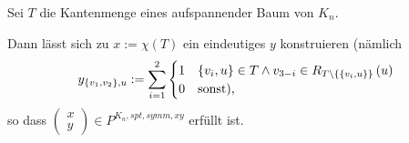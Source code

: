 \documentclass[10p,a4paper,BCOR = 12mm, DIV=15]{scrbook}
\begin{document}
\begin{Sa}
Sei $T$ die Kantenmenge eines aufspannender Baum von $K_n$.

Dann lässt sich zu $x:=\chi\left(T\right)$ ein eindeutiges $y$ konstruieren (nämlich 
\begin{equation}
y_{\left\{v_1, v_2\right\}, u} := \sum_{i=1}^2 \begin{cases}
1 & \left\{v_i, u\right\}\in T\wedge v_{3-i}\in R_{T\backslash \left\{\left\{v_i, u\right\}\right\}}\left(u\right)\\
0 & \textnormal{sonst),}
\end{cases} \label{eq:y_belegung}
\end{equation}
so dass $
\left(
\begin{array}{c}
x \\
y
\end{array}
\right)
\in P^{K_n, spt, symm, xy}$ erfüllt ist.
\end{Sa}
\end{document}
